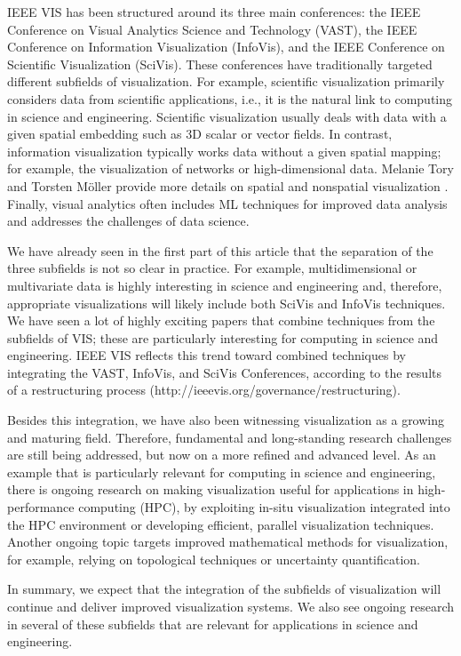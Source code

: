\documentclass[10pt,journal,compsoc]{IEEEtran}
\begin{document}
IEEE VIS has been structured around its three main conferences: the IEEE Conference on Visual Analytics Science and Technology (VAST), the IEEE Conference on Information Visualization (InfoVis), and the IEEE Conference on Scientific Visualization (SciVis). These conferences have traditionally targeted different subfields of visualization. For example, scientific visualization primarily considers data from scientific applications, i.e., it is the natural link to computing in science and engineering. Scientific visualization usually deals with data with a given spatial embedding such as 3D scalar or vector fields. In contrast, information visualization typically works data without a given spatial mapping; for example, the visualization of networks or high-dimensional data. Melanie Tory and Torsten M{\"o}ller provide more details on spatial and nonspatial visualization \cite{ToryM04}. Finally, visual analytics often includes ML techniques for improved data analysis and addresses the challenges of data science.

We have already seen in the first part of this article that the separation of the three subfields is not so clear in practice. For example, multidimensional or multivariate data is highly interesting in science and engineering and, therefore, appropriate visualizations will likely include both SciVis and InfoVis techniques. We have seen a lot of highly exciting papers that combine techniques from the subfields of VIS; these are particularly interesting for computing in science and engineering. 
IEEE VIS reflects this trend toward combined techniques by integrating the VAST, InfoVis, and SciVis Conferences, according to the results of a restructuring process (http://ieeevis.org/governance/restructuring).

Besides this integration, we have also been witnessing visualization as a growing and maturing field. Therefore, fundamental and long-standing research challenges are still being addressed, but now on a more refined and advanced level. As an example that is particularly relevant for computing in science and engineering, there is ongoing research on making visualization useful for applications in high-performance computing (HPC), by exploiting in-situ visualization integrated into the HPC environment or developing efficient, parallel visualization techniques. Another ongoing topic targets improved mathematical methods for visualization, for example, relying on topological techniques or uncertainty quantification. 

In summary, we expect that the integration of the subfields of visualization will continue and deliver improved visualization systems. We also see ongoing research in several of these subfields that are relevant for applications in science and engineering.
\end{document}
